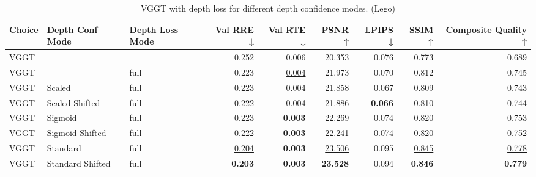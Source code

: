 \begin{table}[H]
\caption{\ifdefined\customcaption \customcaption \else VGGT with depth loss for different depth confidence modes. (Lego) \fi}
\label{tab:05_depth_conf_mode_lego}
\centering
\scriptsize
\begin{tabular}{lllrrrrrr}
\toprule
Choice & Depth Conf Mode & Depth Loss Mode & Val RRE ↓ & Val RTE ↓ & PSNR ↑ & LPIPS ↓ & SSIM ↑ & Composite Quality ↑ \\
\midrule
VGGT &  &  & 0.252 & 0.006 & 20.353 & 0.076 & 0.773 & 0.689 \\
VGGT &  & full & 0.223 & \underline{0.004} & 21.973 & 0.070 & 0.812 & 0.745 \\
VGGT & Scaled & full & 0.223 & \underline{0.004} & 21.858 & \underline{0.067} & 0.809 & 0.743 \\
VGGT & Scaled Shifted & full & 0.222 & \underline{0.004} & 21.886 & \textbf{0.066} & 0.810 & 0.744 \\
VGGT & Sigmoid & full & 0.223 & \textbf{0.003} & 22.269 & 0.074 & 0.820 & 0.753 \\
VGGT & Sigmoid Shifted & full & 0.222 & \textbf{0.003} & 22.241 & 0.074 & 0.820 & 0.752 \\
VGGT & Standard & full & \underline{0.204} & \textbf{0.003} & \underline{23.506} & 0.095 & \underline{0.845} & \underline{0.778} \\
VGGT & Standard Shifted & full & \textbf{0.203} & \textbf{0.003} & \textbf{23.528} & 0.094 & \textbf{0.846} & \textbf{0.779} \\
\bottomrule
\end{tabular}
\end{table}